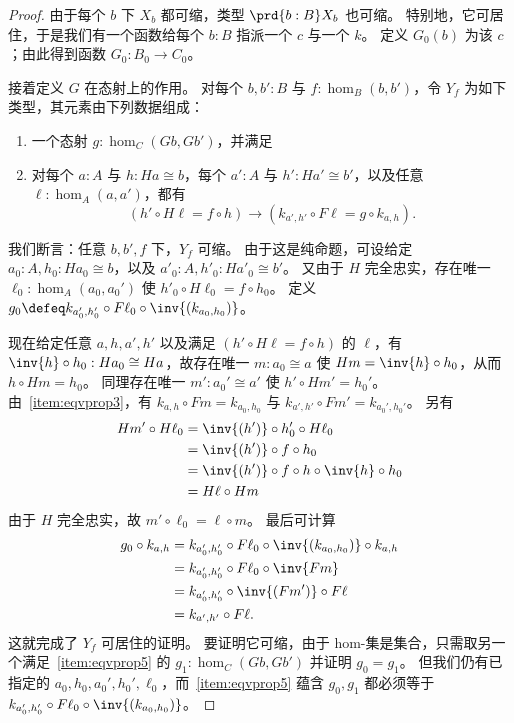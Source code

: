 \begin{proof}
  由于每个 $b$ 下 $X_b$ 都可缩，类型 $\prd{b:B} X_b$ 也可缩。
  特别地，它可居住，于是我们有一个函数给每个 $b:B$ 指派一个 $c$ 与一个 $k$。
  定义 $G_0(b)$ 为该 $c$；由此得到函数 $G_0 :B_0 \to C_0$。

  接着定义 $G$ 在态射上的作用。
  对每个 $b,b':B$ 与 $f:\hom_B(b,b')$，令 $Y_f$ 为如下类型，其元素由下列数据组成：
  \begin{enumerate}[resume]
  \item 一个态射 $g:\hom_C(Gb,Gb')$，并满足
  \item 对每个 $a:A$ 与 $h:Ha\cong b$，每个 $a':A$ 与 $h':Ha'\cong b'$，以及任意 $\ell:\hom_A(a,a')$，都有\label{item:eqvprop5}
    \[ (h' \circ H\ell = f \circ h)
    \to
    (k_{a',h'} \circ F\ell = g\circ k_{a,h}). \]
  \end{enumerate}
  我们断言：任意 $b,b',f$ 下，$Y_f$ 可缩。
  由于这是纯命题，可设给定 $a_0:A,h_0:Ha_0\cong b$，以及 $a'_0:A,h'_0:Ha'_0\cong b'$。
  又由于 $H$ 完全忠实，存在唯一 $\ell_0:\hom_A(a_0,a_0')$ 使 $h'_0 \circ H\ell_0 = f \circ h_0$。
  定义 $g_0 \defeq k_{a_0',h_0'} \circ F \ell_0 \circ \inv{(k_{a_0,h_0})}$。

  现在给定任意 $a,h,a',h'$ 以及满足 $(h' \circ H\ell = f \circ h)$ 的 $\ell$，有 $\inv{h}\circ h_0:Ha_0\cong Ha$，故存在唯一 $m:a_0\cong a$ 使 $Hm = \inv{h}\circ h_0$，从而 $h\circ Hm = h_0$。
  同理存在唯一 $m':a_0'\cong a'$ 使 $h'\circ Hm' = h_0'$。
  由~\ref{item:eqvprop3}，有 $k_{a,h}\circ Fm = k_{a_0,h_0}$ 与 $k_{a',h'}\circ Fm' = k_{a_0',h_0'}$。
  另有
  \begin{align*}
    Hm' \circ H\ell_0
    &= \inv{(h')} \circ h_0' \circ H\ell_0\\
    &= \inv{(h')} \circ f \circ h_0\\
    &= \inv{(h')} \circ f \circ h \circ \inv{h} \circ h_0\\
    &= H\ell \circ Hm
  \end{align*}
  由于 $H$ 完全忠实，故 $m'\circ \ell_0 = \ell\circ m$。
  最后可计算
  \begin{align*}
    g_0 \circ k_{a,h}
    &= k_{a_0',h_0'} \circ F \ell_0 \circ \inv{(k_{a_0,h_0})} \circ k_{a,h}\\
    &= k_{a_0',h_0'} \circ F \ell_0 \circ \inv{Fm}\\
    &= k_{a_0',h_0'} \circ \inv{(Fm')} \circ F\ell\\
    &= k_{a',h'}\circ F\ell.
  \end{align*}
  这就完成了 $Y_f$ 可居住的证明。
  要证明它可缩，由于 hom-集是集合，只需取另一个满足~\ref{item:eqvprop5} 的 $g_1:\hom_C(Gb,Gb')$ 并证明 $g_0=g_1$。
  但我们仍有已指定的 $a_0,h_0,a_0',h_0',\ell_0$，而~\ref{item:eqvprop5} 蕴含 $g_0,g_1$ 都必须等于 $k_{a_0',h_0'} \circ F \ell_0 \circ \inv{(k_{a_0,h_0})}$。


\end{proof}
